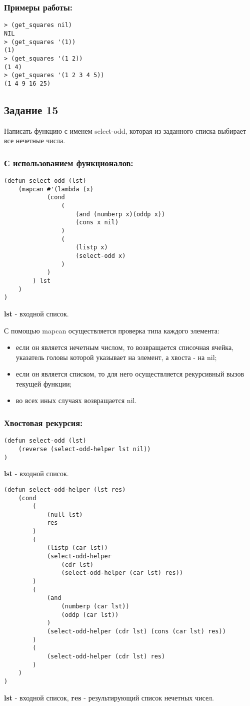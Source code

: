 \documentclass[a4paper,12pt]{article}
\begin{document}
\newpage

\subsubsection*{Примеры работы:}
\begin{lstlisting}
> (get_squares nil)
NIL
> (get_squares '(1))
(1)
> (get_squares '(1 2))
(1 4)
> (get_squares '(1 2 3 4 5))
(1 4 9 16 25)
\end{lstlisting}

\subsection*{Задание 15}

Написать функцию с именем select-odd, которая из заданного списка выбирает все нечетные числа.

\subsubsection*{С использованием функционалов:}
\begin{lstlisting}[caption=Функция получения всех нечетных чисел из списка]
(defun select-odd (lst)
	(mapcan #'(lambda (x)
			(cond 
				(
					(and (numberp x)(oddp x))
					(cons x nil)
				)
				(
					(listp x)
					(select-odd x)
				)
			)
		) lst
	)
)
\end{lstlisting}
\textbf{lst} - входной список.

С помощью mapcan осуществляется проверка типа каждого элемента:
\begin{itemize}
	\item если он является нечетным числом, то возвращается списочная ячейка, указатель головы которой указывает на элемент, а хвоста - на nil;
	\item если он является списком, то для него осуществляется рекурсивный вызов текущей функции;
	\item во всех иных случаях возвращается nil.
\end{itemize}

\subsubsection*{Хвостовая рекурсия:}
\begin{lstlisting}[caption=Функция-обертка получения всех нечетных чисел из списка]
(defun select-odd (lst)
	(reverse (select-odd-helper lst nil))
)
\end{lstlisting}
\textbf{lst} - входной список.
\begin{lstlisting}[caption=Функция получения всех нечетных чисел из списка]
(defun select-odd-helper (lst res)
	(cond
		(
			(null lst)
			res
		)
		(
			(listp (car lst))
			(select-odd-helper 
				(cdr lst) 
				(select-odd-helper (car lst) res))
		)
		(
			(and 
				(numberp (car lst))
				(oddp (car lst))
			)
			(select-odd-helper (cdr lst) (cons (car lst) res))
		)
		(
			(select-odd-helper (cdr lst) res)
		)
	)
)
\end{lstlisting}
\textbf{lst} - входной список, \textbf{res} - результирующий список нечетных чисел.
\end{document}
